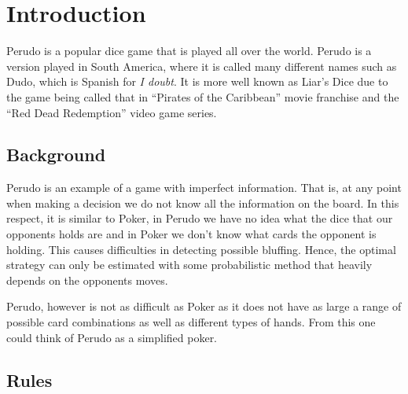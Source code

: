 \chapter{Introduction}

Perudo is a popular dice game that is played all over the world. Perudo is a version played in South America, where it is called many different names such as Dudo, which is Spanish for \textit{I doubt}. It is more well known as Liar's Dice due to the game being called that in ``Pirates of the Caribbean'' movie franchise and the ``Red Dead Redemption'' video game series.

\section{Background}

Perudo is an example of a game with imperfect information. That is, at any point when making a decision we do not know all the information on the board. In this respect, it is similar to Poker, in Perudo we have no idea what the dice that our opponents holds are and in Poker we don't know what cards the opponent is holding. This causes difficulties in detecting possible bluffing. Hence, the optimal strategy can only be estimated with some probabilistic method that heavily depends on the opponents moves.

Perudo, however is not as difficult as Poker as it does not have as large a range of possible card combinations as well as different types of hands. From this one could think of Perudo as a simplified poker.

\section{Rules}

